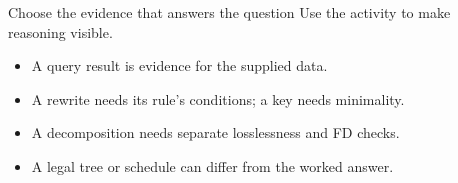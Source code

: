 \begin{frame}[t]{Choose the evidence that answers the question}
Use the activity to make reasoning visible.
\medskip
\begin{itemize}
\item A query result is evidence for the supplied data.
\item A rewrite needs its rule's conditions; a key needs minimality.
\item A decomposition needs separate losslessness and FD checks.
\item A legal tree or schedule can differ from the worked answer.
\end{itemize}
\end{frame}
